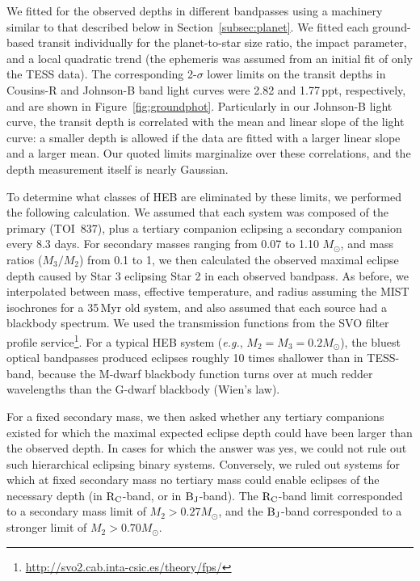 \documentclass[12pt,twocolumn,tighten]{aastex63}
\newcommand{\tn}{TOI~837} %
\begin{document}
We fitted for the observed depths in different bandpasses using a
machinery similar to that described below in
Section~\ref{subsec:planet}.  We fitted each ground-based transit
individually for the planet-to-star size ratio, the impact parameter,
and a local quadratic trend (the ephemeris was assumed from an initial
fit of only the TESS data).  The corresponding 2-$\sigma$ lower limits
on the transit depths in Cousins-R and Johnson-B band light curves
were 2.82 and 1.77$\,$ppt, respectively, and are shown in
Figure~\ref{fig:groundphot}.  Particularly in our Johnson-B light
curve, the transit depth is correlated with the mean and linear slope
of the light curve: a smaller depth is allowed if the data are fitted
with a larger linear slope and a larger mean.  Our quoted limits
marginalize over these correlations, and the depth measurement itself
is nearly Gaussian.

To determine what classes of HEB are eliminated by these limits, we
performed the following calculation.  We assumed that each system was
composed of the primary (\tn), plus a tertiary companion eclipsing a
secondary companion every 8.3 days.  For secondary masses ranging from
0.07 to 1.10 $M_\odot$, and mass ratios ($M_3/M_2$) from 0.1 to 1, we
then calculated the observed maximal eclipse depth caused by Star 3
eclipsing Star 2 in each observed bandpass.  As before, we
interpolated between mass, effective temperature, and radius assuming
the MIST isochrones for a 35$\,$Myr old system, and also assumed that
each source had a blackbody spectrum.  We used the transmission
functions from the SVO filter profile
service\footnote{\url{http://svo2.cab.inta-csic.es/theory/fps/}}.  For
a typical HEB system ({\it e.g.}, $M_2=M_3=0.2M_\odot$), the bluest
optical bandpasses produced eclipses roughly 10 times shallower than
in TESS-band, because the M-dwarf blackbody function turns over at
much redder wavelengths than the G-dwarf blackbody (Wien's law).

For a fixed secondary mass, we then asked whether any tertiary
companions existed for which the maximal expected eclipse depth could
have been larger than the observed depth.  In cases for which the
answer was yes, we could not rule out such hierarchical eclipsing
binary systems.  Conversely, we ruled out systems for which at fixed
secondary mass no tertiary mass could enable eclipses of the necessary
depth (in ${\rm R_C}$-band, or in ${\rm B_J}$-band).  The ${\rm
R_C}$-band limit corresponded to a secondary mass limit of $M_2 > 0.27
M_\odot$, and the ${\rm B_J}$-band corresponded to a stronger limit of
$M_2 > 0.70 M_\odot$.
\end{document}
